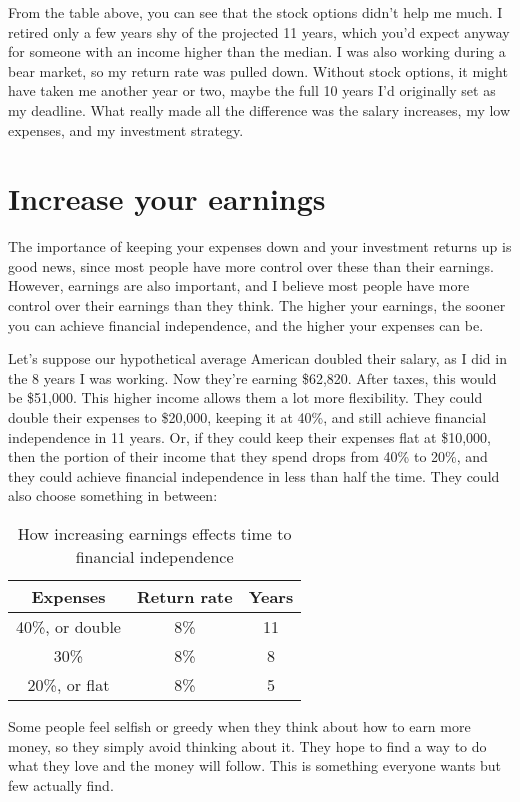 From the table above, you can see that the stock options didn't help me much. I retired only a few years shy of the projected 11 years, which you'd expect anyway for someone with an income higher than the median. I was also working during a bear market, so my return rate was pulled down. Without stock options, it might have taken me another year or two, maybe the full 10 years I'd originally set as my deadline. What really made all the difference was the salary increases, my low expenses, and my investment strategy.

\section{Increase your earnings}
The importance of keeping your expenses down and your investment returns up is good news, since most people have more control over these than their earnings. However, earnings are also important, and I believe most people have more control over their earnings than they think. The higher your earnings, the sooner you can achieve financial independence, and the higher your expenses can be.

Let's suppose our hypothetical average American doubled their salary, as I did in the 8 years I was working. Now they're earning \$62,820. After taxes, this would be \$51,000. This higher income allows them a lot more flexibility. They could double their expenses to \$20,000, keeping it at 40\%, and still achieve financial independence in 11 years. Or, if they could keep their expenses flat at \$10,000, then the portion of their income that they spend drops from 40\% to 20\%, and they could achieve financial independence in less than half the time. They could also choose something in between:

\begin{table}[ht]
\caption{How increasing earnings effects time to financial independence}
\centering
\begin{tabular}{c c c}
\hline\hline
Expenses & Return rate & Years \\
\hline
40\%, or double & 8\% & 11 \\
30\% & 8\% & 8 \\
20\%, or flat & 8\% & 5 \\
\hline
\end{tabular}
\end{table}

Some people feel selfish or greedy when they think about how to earn more money, so they simply avoid thinking about it. They hope to find a way to do what they love and the money will follow. This is something everyone wants but few actually find.

